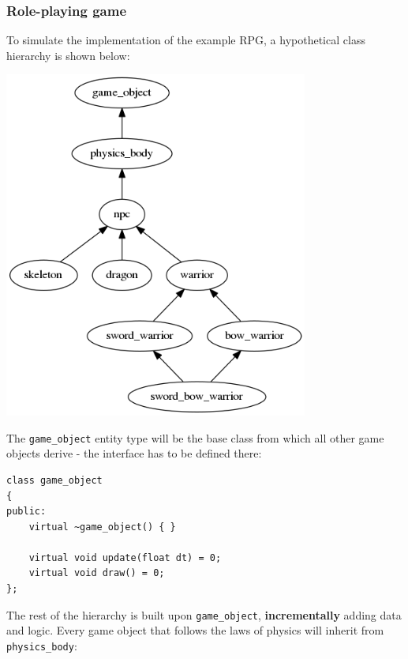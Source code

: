 \documentclass[twoside, 12pt, a4paper, openany]{book}
\let\origfigure=\figure
\let\endorigfigure=\endfigure
\renewenvironment{figure}[1][]{%
\origfigure[H]
}{%
\endorigfigure
}
\begin{document}
\subsubsection{Role-playing game}\label{role-playing-game-1}

To simulate the implementation of the example RPG, a hypothetical class
hierarchy is shown below:

\begin{figure}[htbp]
\centering
\includegraphics[width=0.75000\textwidth]{source/figures/generated/ecs/overview/oop/example_hierarchy_rpg.png}
\caption{Object-oriented inheritance: RPG entity hierarchy}
\end{figure}

The
\texttt{game_object}
entity type will be the base class from which all other game objects
derive - the interface has to be defined there:

\begin{verbatim}
class game_object
{
public:
    virtual ~game_object() { }

    virtual void update(float dt) = 0;
    virtual void draw() = 0;
};
\end{verbatim}

The rest of the hierarchy is built upon
\texttt{game_object},
\textbf{incrementally} adding data and logic. Every game object that
follows the laws of physics will inherit from
\texttt{physics_body}:
\end{document}
